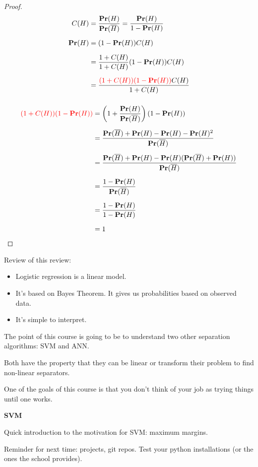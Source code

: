 \begin{proof}
  \begin{align*}
    C(H) & = \frac{\mathbf{Pr}(H)}{\mathbf{Pr}(\overline{H})} =
           \frac{\mathbf{Pr}(H)}{1-\mathbf{Pr}(H)} \\[2mm]
    \mathbf{Pr}(H) & = (1-\mathbf{Pr}(H)) C(H)  \\[2mm]
         & = \frac{1+C(H)}{1+C(H)}(1-\mathbf{Pr}(H)) C(H) \\[2mm]
         & = \frac{\textcolor{red}{(1+C(H))(1-\mathbf{Pr}(H))} C(H)}{1+C(H)} \\[2mm]
  \end{align*}

  \begin{align*}
    \textcolor{red}{(1+C(H))(1-\mathbf{Pr}(H))} & = \left(1+\frac{\mathbf{Pr}(H)}{\mathbf{Pr}(\overline
                               H)}\right) \left(1-\mathbf{Pr}(H)\right) \\[2mm]
                             &= \frac{
                               \mathbf{Pr}(\overline H)
                               + \mathbf{Pr}(H)
                               - \mathbf{Pr}(H)
                               - \mathbf{Pr}(H)^2}
                               {\mathbf{Pr}(\overline H)} \\[2mm]
                             &= \frac{\mathbf{Pr}(\overline H) + \mathbf{Pr}(H) -
                               \mathbf{Pr}(H)(\mathbf{Pr}(\overline H) + \mathbf{Pr}(H))}
                               {\mathbf{Pr}(\overline H)} \\[2mm]
                             &= \frac{1-\mathbf{Pr}(H)}{\mathbf{Pr}(\overline H)} \\[2mm]
                             &= \frac{1-\mathbf{Pr}(H)}{1-\mathbf{Pr}(H)} \\[2mm]
                             &= 1
  \end{align*}
\end{proof}

\bigskip

Review of this review:
\begin{itemize}
\item Logistic regression is a linear model.
\item It's based on Bayes Theorem.  It gives us probabilities based on
  observed data.
\item It's simple to interpret.
\end{itemize}

The point of this course is going to be to understand two other
separation algorithms: SVM and ANN.

Both have the property that they can be linear or transform their
problem to find non-linear separators.

One of the goals of this course is that you don't think of your job as
trying things until one works.

\textbf{SVM}

Quick introduction to the motivation for SVM: maximum margins.

Reminder for next time: projects, git repos.  Test your python
installations (or the ones the school provides).


